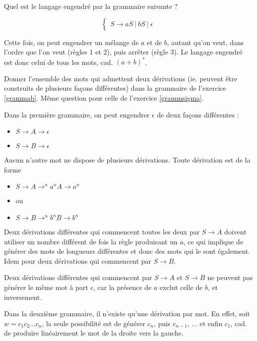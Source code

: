 \begin{exercice}
\label{grammsigma}
Quel est le langage engendré par la grammaire suivante ?

\[
\begin{cases}
S \rightarrow aS~|~bS~|~\epsilon 
\end{cases}
\]

\end{exercice}

\begin{correction*}
Cette fois, on peut engendrer un mélange de $a$ et de $b$, autant qu'on veut, dans l'ordre que l'on veut (règles 1 et 2), puis arrêter (règle 3). Le langage engendré est donc celui de tous les mots, cad. $(a+b)^*$.
\end{correction*}

\begin{exercice}
Donner l'ensemble des mots qui admettent deux dérivations (ie. peuvent être construits de plusieurs façons différentes) dans la grammaire de l'exercice \ref{grammab}. Même question pour celle de l'exercice \ref{grammsigma}.
\end{exercice}

\begin{correction*}
Dans la première grammaire, on peut engendrer $\epsilon$ de deux façons différentes :

\begin{itemize}
\item $S \rightarrow A \rightarrow \epsilon$
\item $S \rightarrow B \rightarrow \epsilon$
\end{itemize}

Aucun n'autre mot ne dispose de plusieurs dérivations. Toute dérivation est de la forme 

\begin{itemize}
\item $S \rightarrow A \rightarrow^n a^nA \rightarrow a^n$
\item[] ou
\item $S \rightarrow B \rightarrow^n b^nB \rightarrow b^n$
\end{itemize}

Deux dérivations différentes qui commencent toutes les deux par $S \rightarrow A$ doivent utiliser un nombre différent de fois la règle produisant un $a$, ce qui implique de générer des mots de longueurs différentes et donc des mots qui le sont également. Idem pour deux dérivations qui commencent par $S \rightarrow B$.

Deux dérivations différentes qui commencent par $S \rightarrow A$ et $S \rightarrow B$ ne peuvent pas générer le même mot à part $\epsilon$, car la présence de $a$ exclut celle de $b$, et inversement. 

Dans la deuxième grammaire, il n'existe qu'une dérivation par mot. En effet, soit $w = c_1c_2...c_n$, la seule possibilité est de générer $c_n$, puis $c_{n-1}$, ... et enfin $c_1$, cad. de produire linéairement le mot de la droite vers la gauche.
\end{correction*}

